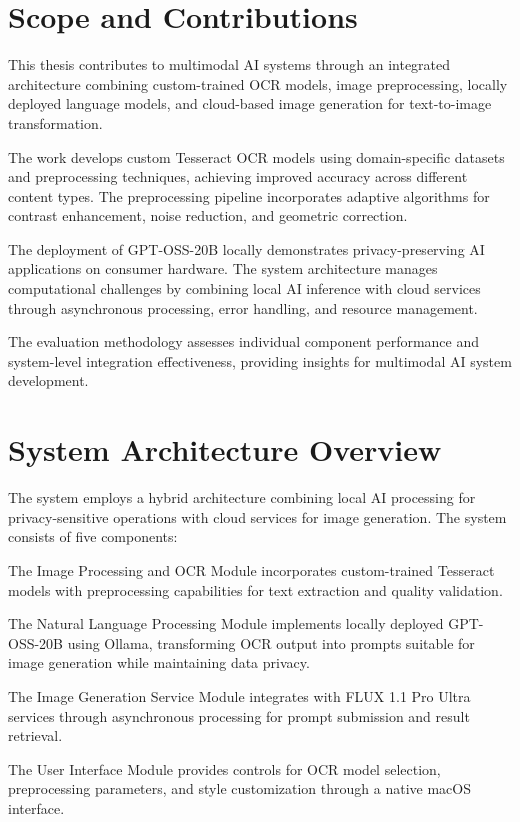 \section{Scope and Contributions}

This thesis contributes to multimodal AI systems through an integrated architecture combining custom-trained OCR models, image preprocessing, locally deployed language models, and cloud-based image generation for text-to-image transformation.

The work develops custom Tesseract OCR models using domain-specific datasets and preprocessing techniques, achieving improved accuracy across different content types. The preprocessing pipeline incorporates adaptive algorithms for contrast enhancement, noise reduction, and geometric correction.

The deployment of GPT-OSS-20B locally demonstrates privacy-preserving AI applications on consumer hardware. The system architecture manages computational challenges by combining local AI inference with cloud services through asynchronous processing, error handling, and resource management.

The evaluation methodology assesses individual component performance and system-level integration effectiveness, providing insights for multimodal AI system development.

\section{System Architecture Overview}

The system employs a hybrid architecture combining local AI processing for privacy-sensitive operations with cloud services for image generation. The system consists of five components:

The Image Processing and OCR Module incorporates custom-trained Tesseract models with preprocessing capabilities for text extraction and quality validation.

The Natural Language Processing Module implements locally deployed GPT-OSS-20B using Ollama, transforming OCR output into prompts suitable for image generation while maintaining data privacy.

The Image Generation Service Module integrates with FLUX 1.1 Pro Ultra services through asynchronous processing for prompt submission and result retrieval.

The User Interface Module provides controls for OCR model selection, preprocessing parameters, and style customization through a native macOS interface.

